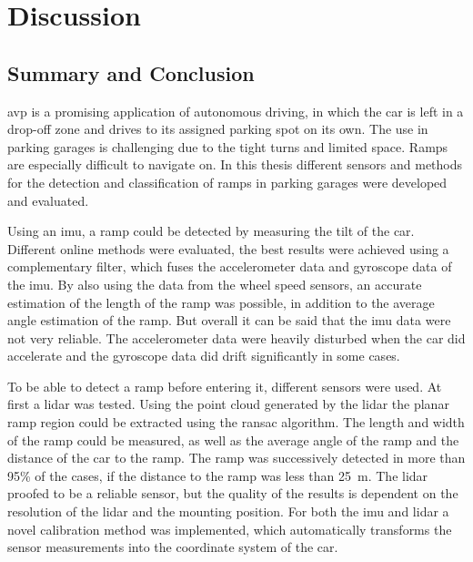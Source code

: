 \chapter{Discussion}
\label{ch:Conclusion}

\section{Summary and Conclusion}
\gls{avp} is a promising application of autonomous driving, in which the car is left in a drop-off zone and drives to its assigned parking spot on its own.
The use in parking garages is challenging due to the tight turns and limited space.
Ramps are especially difficult to navigate on.
In this thesis different sensors and methods for the detection and classification of ramps in parking garages were developed and evaluated.

Using an \gls{imu}, a ramp could be detected by measuring the tilt of the car.
Different online methods were evaluated, the best results were achieved using a complementary filter, which fuses the accelerometer data and gyroscope data of the \gls{imu}.
By also using the data from the wheel speed sensors, an accurate estimation of the length of the ramp was possible, in addition to the average angle estimation of the ramp.
But overall it can be said that the \gls{imu} data were not very reliable.
The accelerometer data were heavily disturbed when the car did accelerate and the gyroscope data did drift significantly in some cases.

To be able to detect a ramp before entering it, different sensors were used.
At first a \gls{lidar} was tested.
Using the point cloud generated by the \gls{lidar} the planar ramp region could be extracted using the \gls{ransac} algorithm.
The length and width of the ramp could be measured, as well as the average angle of the ramp and the distance of the car to the ramp.
The ramp was successively detected in more than 95\% of the cases, if the distance to the ramp was less than \SI{25}{\metre}.
The \gls{lidar} proofed to be a reliable sensor, but the quality of the results is dependent on the resolution of the \gls{lidar} and the mounting position.
For both the \gls{imu} and \gls{lidar} a novel calibration method was implemented, which automatically transforms the sensor measurements into the coordinate system of the car.

